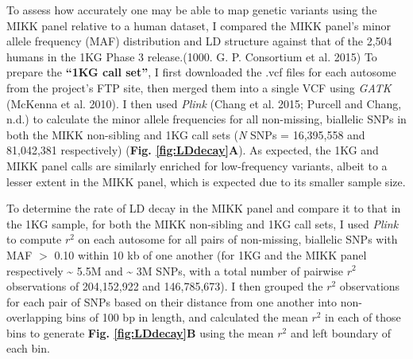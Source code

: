 \documentclass[
]{book}
\begin{document}
To assess how accurately one may be able to map genetic variants using the MIKK panel relative to a human dataset, I compared the MIKK panel's minor allele frequency (MAF) distribution and LD structure against that of the 2,504 humans in the 1KG Phase 3 release.(1000. G. P. Consortium et al. 2015) To prepare the \textbf{``1KG call set''}, I first downloaded the .vcf files for each autosome from the project's FTP site, then merged them into a single VCF using \emph{GATK} (McKenna et al. 2010). I then used \emph{Plink} (Chang et al. 2015; Purcell and Chang, n.d.) to calculate the minor allele frequencies for all non-missing, biallelic SNPs in both the MIKK non-sibling and 1KG call sets (\emph{N} SNPs = 16,395,558 and 81,042,381 respectively) (\textbf{Fig. \ref{fig:LDdecay}A}). As expected, the 1KG and MIKK panel calls are similarly enriched for low-frequency variants, albeit to a lesser extent in the MIKK panel, which is expected due to its smaller sample size.

To determine the rate of LD decay in the MIKK panel and compare it to that in the 1KG sample, for both the MIKK non-sibling and 1KG call sets, I used \emph{Plink} to compute \(r^2\) on each autosome for all pairs of non-missing, biallelic SNPs with MAF \(>\) 0.10 within 10 kb of one another (for 1KG and the MIKK panel respectively \textasciitilde{} 5.5M and \textasciitilde{} 3M SNPs, with a total number of pairwise \(r^2\) observations of 204,152,922 and 146,785,673). I then grouped the \(r^2\) observations for each pair of SNPs based on their distance from one another into non-overlapping bins of 100 bp in length, and calculated the mean \(r^2\) in each of those bins to generate \textbf{Fig. \ref{fig:LDdecay}B} using the mean \(r^2\) and left boundary of each bin.
\end{document}
